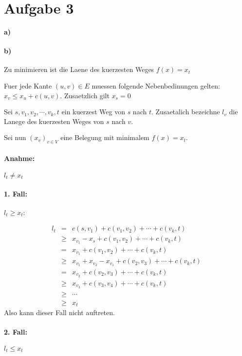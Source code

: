 \section*{Aufgabe 3}
\paragraph{a)}


\paragraph{b)}
Zu minimieren ist die Laene des kuerzesten Weges $f(x) = x_t$

Fuer jede Kante $(u,v) \in E$ muessen folgende Nebenbedinungen gelten:
$x_v \leq x_u + c(u,v)$. Zusaetzlich gilt $x_s = 0$

Sei $s, v_1, v_2, \cdots, v_k, t$ ein kuerzest Weg von $s$ nach $t$. Zusaetalich bezeichne
$l_v$ die Lanege des kuerzesten Weges von $s$ nach $v$.

Sei nun $(x_v)_{v\in V}$ eine Belegung mit minimalem $f(x) = x_t$.

\paragraph{Anahme:} $l_t \neq x_t$

\paragraph{1. Fall:} $l_t \geq x_t$:

\begin{eqnarray}
    l_t &=&         c(s,v_1) + c(v_1,v_2) + \cdots + c(v_k,t) \\
      &\geq& x_{v_1} - x_s + c(v_1,v_2) + \cdots + c(v_k,t) \\
      &=&    x_{v_1} + c(v_1,v_2) + \cdots + c(v_k,t) \\
      &\geq& x_{v_1} + x_{v_2} - x_{v_1} + c(v_2,v_3) + \cdots + c(v_k,t) \\
      &=&              x_{v_2}           + c(v_2,v_3) + \cdots + c(v_k,t) \\
      &\geq&           x_{v_3}           + c(v_3,v_4) + \cdots + c(v_k,t) \\
      &\geq& \cdots \\
      &\geq& x_t
\end{eqnarray}
Also kann dieser Fall nicht auftreten.

\paragraph{2. Fall:} $l_t \leq x_t$

